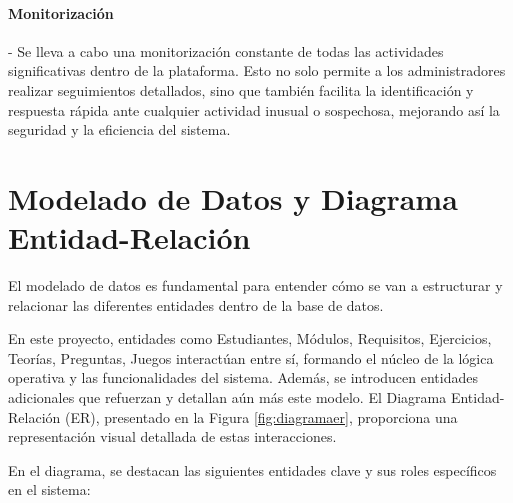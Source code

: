 \paragraph{Monitorización} - Se lleva a cabo una monitorización constante de todas las actividades significativas dentro de la plataforma. Esto no solo permite a los administradores realizar seguimientos detallados, sino que también facilita la identificación y respuesta rápida ante cualquier actividad inusual o sospechosa, mejorando así la seguridad y la eficiencia del sistema.

\section{Modelado de Datos y Diagrama Entidad-Relación} \label{sec:er}

El modelado de datos es fundamental para entender cómo se van a estructurar y relacionar las diferentes entidades dentro de la base de datos. 

En este proyecto, entidades como Estudiantes, Módulos, Requisitos, Ejercicios, Teorías, Preguntas, Juegos interactúan entre sí, formando el núcleo de la lógica operativa y las funcionalidades del sistema. Además, se introducen entidades adicionales que refuerzan y detallan aún más este modelo. El Diagrama Entidad-Relación (ER), presentado en la Figura \ref{fig:diagramaer}, proporciona una representación visual detallada de estas interacciones.

En el diagrama, se destacan las siguientes entidades clave y sus roles específicos en el sistema:

